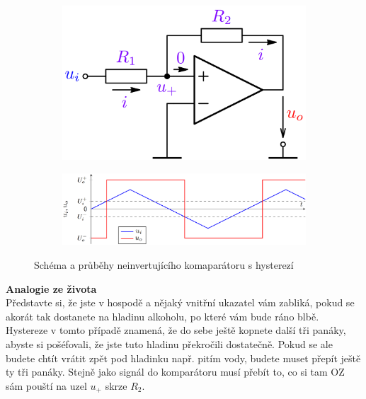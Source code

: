 \documentclass[a4paper,12pt]{article}   %
\begin{document}
\begin{figure}[h!]
    \centering
    \begin{subfigure}{.3\textwidth}
        \centering
        \includegraphics[width=\textwidth]{komparator-noninvert.PNG}
    \end{subfigure}
    \begin{subfigure}{.65\textwidth}
        \centering
        \includegraphics[width=\textwidth]{komparator-noninvert-graf.PNG}
    \end{subfigure}
    \caption{Schéma a průběhy neinvertujícího komaparátoru s hysterezí}
    \label{fig:neinvert:komp}
\end{figure}

\textbf{Analogie ze života}\\
Představte si, že jste v hospodě a nějaký vnitřní ukazatel vám zabliká, pokud se akorát tak dostanete na hladinu alkoholu, po které vám bude ráno blbě. Hystereze v tomto případě znamená, že do sebe ještě kopnete další tři panáky, abyste si pošéfovali, že jste tuto hladinu překročili dostatečně. Pokud se ale budete chtít vrátit zpět pod hladinku např. pitím vody, budete muset přepít ještě ty tři panáky. Stejně jako signál do komparátoru musí přebít to, co si tam OZ sám pouští na uzel $u_+$ skrze $R_2$.
\end{document}
